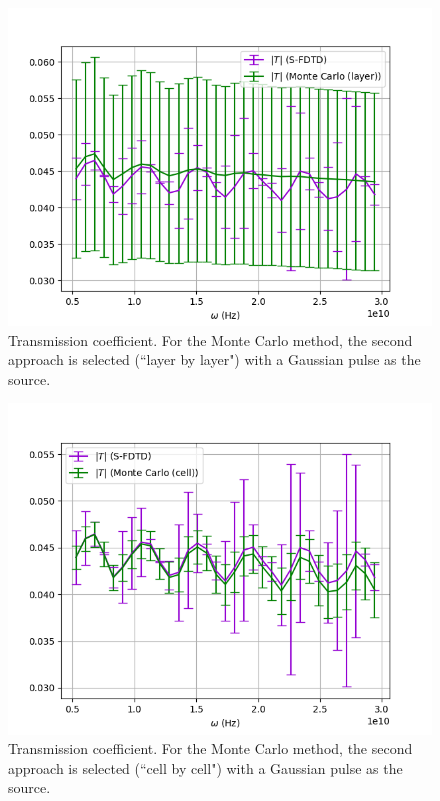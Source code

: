 \documentclass[12pt, oneside]{book}
\begin{document}
\begin{figure}
\centering
\includegraphics[scale=0.65]{Tsfdtdmcgausslayercorr1(7).png}
\caption{Transmission coefficient. For the Monte Carlo method, the second approach is selected (``layer by layer") with a Gaussian pulse as the source.}\label{stdT(7)}
\end{figure}

\begin{figure}
\centering
\includegraphics[scale=0.65]{Tsfdtdmcgausscellcorr1(9).png}
\caption{Transmission coefficient. For the Monte Carlo method, the second approach is selected (``cell by cell") with a Gaussian pulse as the source.}\label{stdT(9)}
\end{figure}
\end{document}
